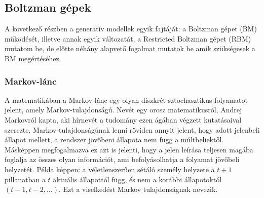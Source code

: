 \subsection{Boltzman gépek}

A következő részben a generatív modellek egyik fajtáját: a Boltzman gépet (BM) működését, illetve annak egyik változatát, a Restricted Boltzman gépet (RBM) mutatom be, de előtte néhány alapvető fogalmat mutatok be amik szükségesek a BM megértéséhez.




\subsubsection{Markov-lánc}

A matematikában a Markov-lánc egy olyan diszkrét sztochasztikus folyamatot jelent, amely Markov-tulajdonságú. Nevét egy orosz matematikusról, Andrej Markovról kapta, aki hírnevét a tudomány ezen ágában végzett kutatásaival szerezte. Markov-tulajdonságúnak lenni röviden annyit jelent, hogy adott jelenbeli állapot mellett, a rendszer jövőbeni állapota nem függ a múltbeliektől. Másképpen megfogalmazva ez azt is jelenti, hogy a jelen leírása teljesen magába foglalja az összes olyan információt, ami befolyásolhatja a folyamat jövőbeli helyzetét. Példa képpen: a véletlenszerűen sétáló személy helyzete a $t+1$ pillanatban a $t$ aktuális állapottól függ, és nem a korábbi állapotoktól $(t-1, t-2,\dots)$. Ezt a viselkedést Markov tulajdonságnak nevezik.

